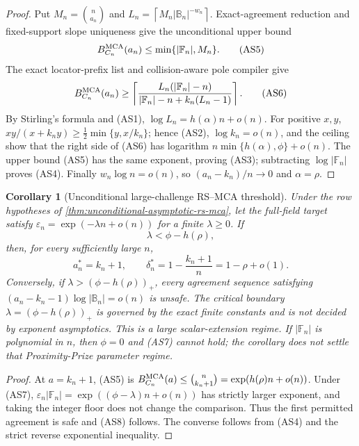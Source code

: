 \documentclass[11pt,a4paper]{amsart}
\numberwithin{equation}{section}
\newtheorem{corollary}[corollary]{Corollary}
\theoremstyle{remark}
\newcommand{\F}{\mathbb F}
\newcommand{\B}{\mathbb B}
\newcommand{\eps}{\varepsilon}
\newcommand{\abs}[1]{\lvert #1\rvert}
\newcommand{\ceil}[1]{\left\lceil #1\right\rceil}
\begin{document}
\begin{proof}
Put \(M_n=\binom n{a_n}\) and
\(L_n=\ceil{M_n\abs{\B_n}^{-w_n}}\).  Exact-agreement reduction and
fixed-support slope uniqueness give the unconditional upper bound
\[
 B_{C_n}^{\rm MCA}(a_n)\le\min\{\abs{\F_n},M_n\}.  \tag{AS5}
\]
The exact locator-prefix list and collision-aware pole compiler give
\[
 B_{C_n}^{\rm MCA}(a_n)\ge
 \left\lceil
 \frac{L_n(\abs{\F_n}-n)}
 {\abs{\F_n}-n+k_n(L_n-1)}
 \right\rceil.                                     \tag{AS6}
\]
By Stirling's formula and \textup{(AS1)},
\(\log L_n=h(\alpha)n+o(n)\).  For positive \(x,y\),
\(xy/(x+k_ny)\ge\frac12\min\{y,x/k_n\}\); hence
\textup{(AS2)}, \(\log k_n=o(n)\), and the ceiling show that the
right side of \textup{(AS6)} has logarithm
\(n\min\{h(\alpha),\phi\}+o(n)\).  The upper bound
\textup{(AS5)} has the same exponent, proving \textup{(AS3)}; subtracting
\(\log\abs{\F_n}\) proves \textup{(AS4)}.  Finally
\(w_n\log n=o(n)\), so \((a_n-k_n)/n\to0\) and
\(\alpha=\rho\).
\end{proof}

\begin{corollary}[Unconditional large-challenge RS--MCA threshold]
\label{cor:unconditional-rs-mca-capacity}
Under the row hypotheses of
\cref{thm:unconditional-asymptotic-rs-mca}, let the full-field target
satisfy \(\eps_n=\exp(-\lambda n+o(n))\) for a finite
\(\lambda\ge0\).  If
\[
                         \lambda<\phi-h(\rho),      \tag{AS7}
\]
then, for every sufficiently large \(n\),
\[
 a_n^*=k_n+1,\qquad
 \delta_n^*=1-\frac{k_n+1}{n}=1-\rho+o(1).         \tag{AS8}
\]
Conversely, if \(\lambda>(\phi-h(\rho))_+\), every agreement sequence
satisfying \((a_n-k_n-1)\log\abs{\B_n}=o(n)\) is unsafe.  The critical
boundary \(\lambda=(\phi-h(\rho))_+\) is governed by the
exact finite constants and is not decided by exponent asymptotics.  This
is a large scalar-extension regime.  If \(\abs{\F_n}\) is polynomial in
\(n\), then \(\phi=0\) and \textup{(AS7)} cannot hold; the corollary does
not settle that Proximity-Prize parameter regime.
\end{corollary}

\begin{proof}
At \(a=k_n+1\), \textup{(AS5)} is
\(B_{C_n}^{\rm MCA}(a)\le\binom n{k_n+1}
=\exp(h(\rho)n+o(n))\).  Under \textup{(AS7)},
\(\eps_n\abs{\F_n}=\exp((\phi-\lambda)n+o(n))\) has strictly larger
exponent, and taking the integer floor does not change the comparison.
Thus the first permitted agreement is safe
and \textup{(AS8)} follows.  The converse follows from \textup{(AS4)}
and the strict reverse exponential inequality.
\end{proof}
\end{document}
